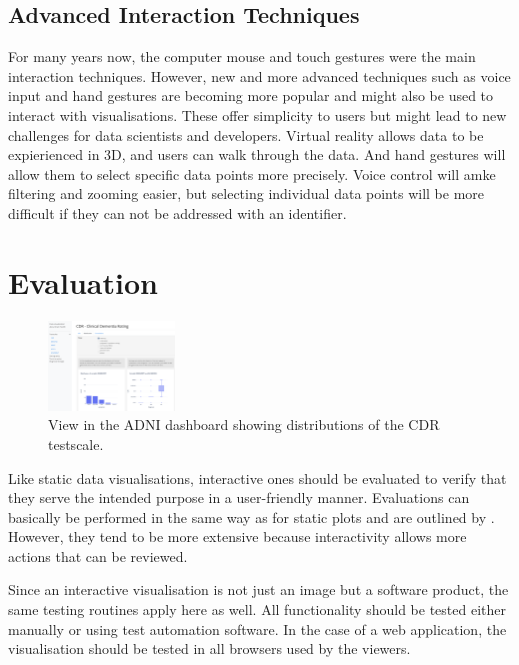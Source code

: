 \documentclass[11pt]{article}
\begin{document}
\subsection{Advanced Interaction Techniques}

For many years now, the computer mouse and touch gestures were the main interaction techniques. However, new and more advanced techniques such as voice input and hand gestures are becoming more popular and might also be used to interact with visualisations. These offer simplicity to users but might lead to new challenges for data scientists and developers. Virtual reality allows data to be expierienced in 3D, and users can walk through the data. And hand gestures will allow them to select specific data points more precisely. Voice control will amke filtering and zooming easier, but selecting individual data points will be more difficult if they can not be addressed with an identifier.

\pagebreak
\section{Evaluation}

\begin{figure}
    \includegraphics[width=0.3\textwidth]{./adni-cdr.png}
    \caption{View in the ADNI dashboard showing distributions of the CDR testscale.}
    \label{adni-cdr}
\end{figure}

Like static data visualisations, interactive ones should be evaluated to verify that they serve the intended purpose in a user-friendly manner. Evaluations can basically be performed in the same way as for static plots and are outlined by \textcite{weibel_fundamentals_2021}. However, they tend to be more extensive because interactivity allows more actions that can be reviewed.

Since an interactive visualisation is not just an image but a software product, the same testing routines apply here as well. All functionality should be tested either manually or using test automation software. In the case of a web application, the visualisation should be tested in all browsers used by the viewers.
\end{document}

